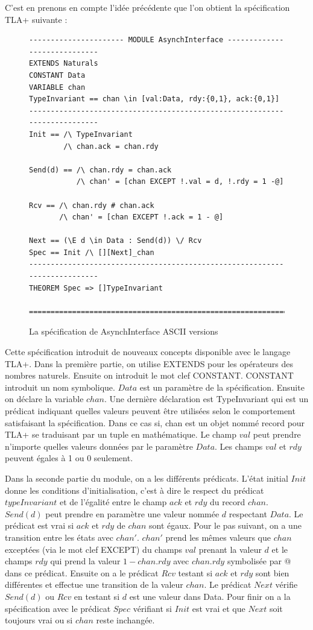 \documentclass[12pt,a4paper]{article}
\begin{document}
C'est en prenons en compte l'idée précédente que l'on obtient la spécification TLA+ suivante :

\begin{figure}[ht]
\begin{lstlisting}[frame=single, basicstyle=\footnotesize]
---------------------- MODULE AsynchInterface -----------------------------
EXTENDS Naturals
CONSTANT Data
VARIABLE chan
TypeInvariant == chan \in [val:Data, rdy:{0,1}, ack:{0,1}]
---------------------------------------------------------------------------
Init == /\ TypeInvariant
        /\ chan.ack = chan.rdy
        
Send(d) == /\ chan.rdy = chan.ack
           /\ chan' = [chan EXCEPT !.val = d, !.rdy = 1 -@]
           
Rcv == /\ chan.rdy # chan.ack
       /\ chan' = [chan EXCEPT !.ack = 1 - @]

Next == (\E d \in Data : Send(d)) \/ Rcv
Spec == Init /\ [][Next]_chan
---------------------------------------------------------------------------
THEOREM Spec => []TypeInvariant       

===========================================================================
\end{lstlisting}
\caption{La spécification de AsynchInterface ASCII versions}
\end{figure}

Cette spécification introduit de nouveaux concepts disponible avec le langage TLA+. Dans la première partie, on utilise EXTENDS pour les opérateurs des nombres naturels. Ensuite on introduit le mot clef CONSTANT. CONSTANT introduit un nom symbolique. $Data$ est un paramètre de la spécification.
Ensuite on déclare la variable $chan$. Une dernière déclaration est TypeInvariant qui est un prédicat indiquant quelles valeurs peuvent être utilisées selon le comportement satisfaisant la spécification. Dans ce cas si, chan est un objet nommé record pour TLA+ se traduisant par un tuple en mathématique. Le champ $val$ peut prendre n'importe quelles valeurs données par le paramètre $Data$. Les champs $val$ et $rdy$ peuvent égales à 1 ou 0 seulement.

Dans la seconde partie du module, on a les différents prédicats. L'état initial $Init$ donne les conditions d'initialisation, c'est à dire le respect du prédicat $typeInvariant$ et de l'égalité entre le champ $ack$ et $rdy$ du record $chan$. $Send(d)$ peut prendre en paramètre une valeur nommée $d$ respectant $Data$. Le prédicat est vrai si $ack$ et $rdy$ de $chan$ sont égaux. Pour le pas suivant, on a une transition entre les états avec $chan'$. $chan'$ prend les mêmes valeurs que $chan$ exceptées (via le mot clef EXCEPT) du champs $val$ prenant la valeur $d$ et le champs $rdy$ qui prend la valeur $1 - chan.rdy$ avec $chan.rdy$ symbolisée par @ dans ce prédicat.
Ensuite on a le prédicat $Rcv$ testant si $ack$ et $rdy$ sont bien différentes et effectue une transition de la valeur $chan$.
Le prédicat $Next$ vérifie $Send(d)$ ou $Rcv$ en testant si $d$ est une valeur dans Data. Pour finir on a la spécification avec le prédicat $Spec$ vérifiant si $Init$ est vrai et que $Next$ soit toujours vrai ou si $chan$ reste inchangée.
\end{document}
